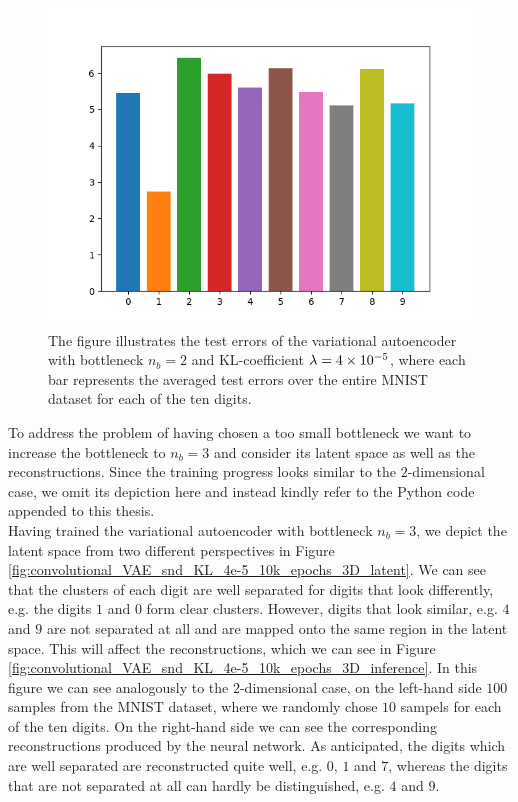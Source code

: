 \begin{figure}
\begin{center}
      \includegraphics[width=0.55\linewidth]{convolutional_VAE_snd_KL_4e-5_10k_epochs_2D_errors}
\end{center}
\caption{The figure illustrates the test errors of the variational autoencoder with bottleneck $n_b=2$ and KL-coefficient $\lambda = \num{4e-5}$, where each bar represents the averaged test errors over the entire MNIST dataset for each of the ten digits.}\label{fig:convolutional_VAE_snd_KL_4e-5_10k_epochs_2D_errors}
\end{figure}


To address the problem of having chosen a too small bottleneck we want to increase the bottleneck to $n_b=3$ and consider its latent space as well as the reconstructions. Since the training progress looks similar to the $2$-dimensional case, we omit its depiction here and instead kindly refer to the Python code appended to this thesis.\\
Having trained the variational autoencoder with bottleneck $n_b=3$, we depict the latent space from two different perspectives in Figure \ref{fig:convolutional_VAE_snd_KL_4e-5_10k_epochs_3D_latent}. We can see that the clusters of each digit are well separated for digits that look differently, e.g. the digits $1$ and $0$ form clear clusters. However, digits that look similar, e.g. $4$ and $9$ are not separated at all and are mapped onto the same region in the latent space. This will affect the reconstructions, which we can see in Figure \ref{fig:convolutional_VAE_snd_KL_4e-5_10k_epochs_3D_inference}. In this figure we can see analogously to the $2$-dimensional case, on the left-hand side $100$ samples from the MNIST dataset, where we randomly chose $10$ sampels for each of the ten digits. On the right-hand side we can see the corresponding reconstructions produced by the neural network. As anticipated, the digits which are well separated are reconstructed quite well, e.g. $0$, $1$ and $7$, whereas the digits that are not separated at all can hardly be distinguished, e.g. $4$ and $9$.


